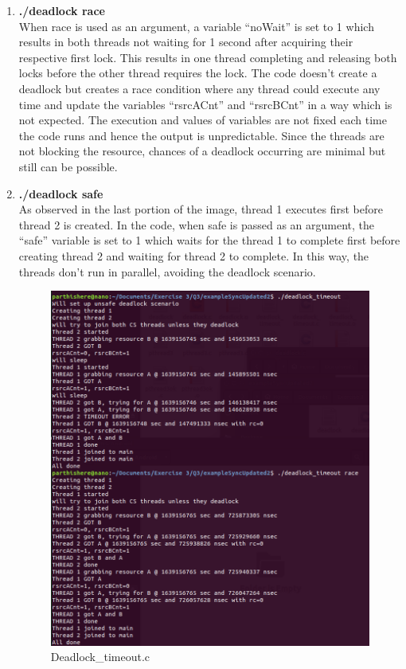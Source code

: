 \documentclass[a4paper,11pt]{article}%
\newenvironment{qanda}{\setlength{\parindent}{0pt}}{\bigskip}
\begin{document}
\begin{qanda}
\begin{enumerate}
\begin{enumerate}
\begin{enumerate}
					      \item \textbf{./deadlock race}\\
					            When race is used as an argument, a variable “noWait” is set to 1 which results in both threads not waiting for 1 second after acquiring their respective first lock. This results in one thread completing and releasing both locks before the other thread requires the lock. The code doesn’t create a deadlock but creates a race condition where any thread could execute any time and update the variables “rsrcACnt” and “rsrcBCnt” in a way which is not expected. The execution and values of variables are not fixed each time the code runs and hence the output is unpredictable. Since the threads are not blocking the resource, chances of a deadlock occurring are minimal but still can be possible.

					      \item \textbf{./deadlock safe}\\
					            As observed in the last portion of the image, thread 1 executes first before thread 2 is created. In the code, when safe is passed as an argument, the “safe” variable is set to 1 which waits for the thread 1 to complete first before creating thread 2 and waiting for thread 2 to complete. In this way, the threads don’t run in parallel, avoiding the deadlock scenario.

								\begin{figure}[H]
									\centering
									\includegraphics[scale=0.6]{figures/deadlock_timeout.png}
									\caption{Deadlock\_timeout.c}
								\end{figure}


\end{enumerate}
\end{enumerate}
\end{enumerate}
\end{qanda}
\end{document}
